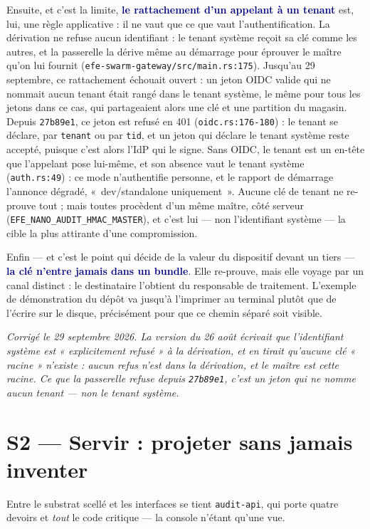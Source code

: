 \documentclass[10pt]{article}
\newcommand{\code}[1]{\texttt{\small #1}}
\newcommand{\mm}[1]{\textbf{\textcolor{navy}{#1}}}
\begin{document}
Ensuite, et c'est la limite, \mm{le rattachement d'un appelant à un tenant} est, lui, une règle applicative : il ne vaut que ce que vaut l'authentification. La dérivation ne refuse aucun identifiant : le tenant système reçoit sa clé comme les autres, et la passerelle la dérive même au démarrage pour éprouver le maître qu'on lui fournit (\code{efe-swarm-gateway/\allowbreak src/\allowbreak main.rs:175}). Jusqu'au 29 septembre, ce rattachement échouait ouvert : un jeton OIDC valide qui ne nommait aucun tenant était rangé dans le tenant système, le même pour tous les jetons dans ce cas, qui partageaient alors une clé et une partition du magasin. Depuis \code{27b89e1}, ce jeton est refusé en 401 (\code{oidc.rs:176-180}) : le tenant se déclare, par \code{tenant} ou par \code{tid}, et un jeton qui déclare le tenant système reste accepté, puisque c'est alors l'IdP qui le signe. Sans OIDC, le tenant est un en-tête que l'appelant pose lui-même, et son absence vaut le tenant système (\code{auth.rs:49}) : ce mode n'authentifie personne, et le rapport de démarrage l'annonce dégradé, «~dev/standalone uniquement~». Aucune clé de tenant ne re-prouve tout ; mais toutes procèdent d'un même maître, côté serveur (\code{EFE\_NANO\_AUDIT\_HMAC\_MASTER}), et c'est lui — non l'identifiant système — la cible la plus attirante d'une compromission.

Enfin — et c'est le point qui décide de la valeur du dispositif devant un tiers — \mm{la clé n'entre jamais dans un bundle}. Elle re-prouve, mais elle voyage par un canal distinct : le destinataire l'obtient du responsable de traitement. L'exemple de démonstration du dépôt va jusqu'à l'imprimer au terminal plutôt que de l'écrire sur le disque, précisément pour que ce chemin séparé soit visible.

{\small\color{grey}\emph{Corrigé le 29 septembre 2026. La version du 26 août écrivait que l'identifiant système est « explicitement refusé » à la dérivation, et en tirait qu'aucune clé « racine » n'existe : aucun refus n'est dans la dérivation, et le maître est cette racine. Ce que la passerelle refuse depuis \code{27b89e1}, c'est un jeton qui ne nomme aucun tenant — non le tenant système.}}

\section{S2 — Servir : projeter sans jamais inventer}

Entre le substrat scellé et les interfaces se tient \code{audit-api}, qui porte quatre devoirs et \emph{tout} le code critique — la console n'étant qu'une vue.
\end{document}

